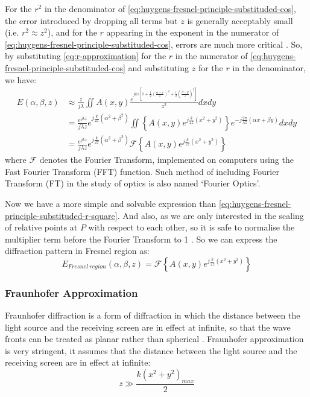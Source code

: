 For the $r^2$ in the denominator of \cref{eq:huygens-fresnel-principle-substituded-cos}, the error introduced by dropping all terms but $z$ is generally acceptably small (i.e. $r^2\approx z^2$), and for the $r$ appearing in the exponent in the numerator of \cref{eq:huygens-fresnel-principle-substituded-cos}, errors are much more critical \cite{Goodman2017}. So, by substituting \cref{eq:r-approximation} for the $r$ in the numerator of \cref{eq:huygens-fresnel-principle-substituded-cos} and substituting $z$ for the $r$ in the denominator, we have:
\begin{align}
  E(\alpha, \beta, z) & \approx \frac{z}{j\lambda} \iint A(x,y)\frac{e^{jkz \left[ 1 + \frac{1}{2} \left( \frac{\alpha-x}{z} \right)^2 + \frac{1}{2} \left(\frac{\beta-y}{z}\right)^2 \right]}}{z^2} dxdy \\
                      & = \frac{e^{jkz}}{j\lambda z} e^{j\frac{k}{2z}(\alpha^2+\beta^2)} \iint \left\{A(x,y)e^{j\frac{k}{2z}(x^2+y^2)}\right\}e^{-j\frac{2\pi}{\lambda z}(\alpha x+\beta y)}dxdy    \\
                      & = \frac{e^{jkz}}{j\lambda z} e^{j\frac{k}{2z}(\alpha^2+\beta^2)} \mathcal{F} \left\{A(x,y)e^{j\frac{k}{2z}(x^2+y^2)}\right\}
\end{align}
where $\mathcal{F}$ denotes the Fourier Transform, implemented on computers using the Fast Fourier Transform (FFT) function. Such method of including Fourier Transform (FT) in the study of optics is also named `Fourier Optics'.

Now we have a more simple and solvable expression than \cref{eq:huygens-fresnel-principle-substituded-r-square}. And also, as we are only interested in the scaling of relative points at $P$ with respect to each other, so it is safe to normalise the multiplier term before the Fourier Transform to 1 \cite{Wilkinson2019}. So we can express the diffraction pattern in Fresnel region as:
\begin{equation}
  E_{Fresnel\ region}(\alpha, \beta, z) = \mathcal{F} \left\{A(x,y)e^{j\frac{k}{2z}(x^2+y^2)}\right\}
  \label{eq:fresnel-diffraction}
\end{equation}


\subsubsection{Fraunhofer Approximation}
Fraunhofer diffraction is a form of diffraction in which the distance between the light source and the receiving screen are in effect at infinite, so that the wave fronts can be treated as planar rather than spherical \cite{Daintith2009}. Fraunhofer approximation is very stringent, it assumes that the distance between the light source and the receiving screen are in effect at infinite:
\begin{equation}
  z\gg \frac{k(x^2+y^2)_{max}}{2}
\end{equation}

